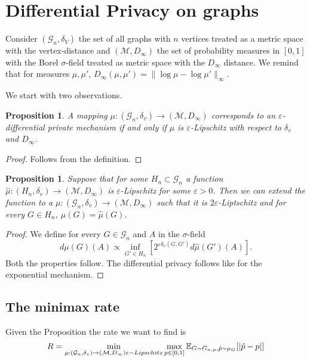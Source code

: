 \documentclass[12pt,a4paper]{article}
\numberwithin{equation}{section}
\newtheorem{proposition}[theorem]{Proposition}
\numberwithin{equation}{section}
\renewcommand{\epsilon}{\varepsilon}
\newcommand{\1}{{\text{\Large $\mathfrak 1$}}}
\newcommand{\2}[1]{{\text{\Large $\mathfrak 1$}\!\left(#1\right)}}
\begin{document}
\section{Differential Privacy on graphs}


Consider $(\mathcal{G}_n,\delta_V)$ the set of all graphs with $n$ vertices treated as a metric space with the vertex-distance and $(\mathcal{M},D_{\infty})$ the set of probability measures in $[0,1]$ with the Borel $\sigma$-field treated as metric space with the $D_{\infty}$ distance. We remind that for measures $ \mu,\mu'$, $D_{\infty}(\mu,\mu')=\|\log \mu-\log \mu'\|_{\infty}$.

We start with two observations.
\begin{proposition}
A mapping $\mu: (\mathcal{G}_n,\delta_v) \rightarrow (\mathcal{M},D_{\infty})$ corresponds to an $\epsilon$-differential private mechanism if and only if $\mu$ is $\epsilon$-Lipschitz with respect to $\delta_v$ and $D_{\infty}$.

\end{proposition}

\begin{proof}
Follows from the definition.
\end{proof}

\begin{proposition}\label{extention}
Suppose that for some $H_n \subset \mathcal{G}_n$ a function $\hat{\mu}: (H_n,\delta_v) \rightarrow (\mathcal{M},D_{\infty})$ is $\epsilon$-Lipschitz for some $\epsilon>0$. Then we can extend the function to a $\mu: (\mathcal{G}_n,\delta_v) \rightarrow (\mathcal{M},D_{\infty})$ such that it is $2\epsilon$-Liptschitz and for every $G \in H_n$, $\mu(G)=\hat{\mu}(G)$.
\end{proposition}

\begin{proof}
We define for every $G \in \mathcal{G}_n$ and $A$ in the $\sigma$-field $$ d\mu(G)(A) \propto \inf_{G' \in H_n} \left[ 2^{\epsilon \delta_v(G,G')} d\hat{\mu}(G')(A) \right].$$ Both the properties follow. The differential privacy follows like for the exponential mechanism.
\end{proof}
 
\subsection{The minimax rate}

Given the Proposition the rate we want to find is $$R=\min_{ \mu :(\mathcal{G}_n,\delta_v) \rightarrow (\mathcal{M},D_{\infty}) \\ \epsilon-Lipschitz} \max_{ p \in [0,1]} \mathbb{E}_{G \sim G_{n,p},\hat{p} \sim \mu_G}[|\hat{p}-p|]$$
\end{document}
